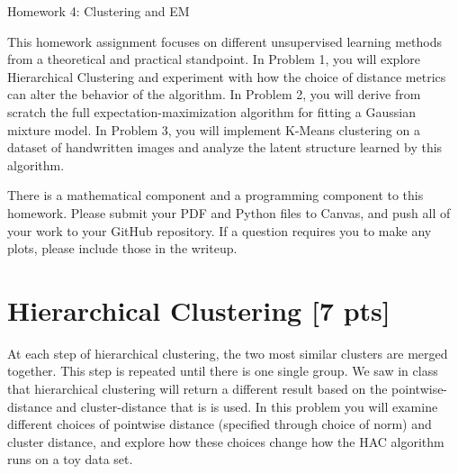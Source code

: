 \documentclass[submit]{harvardml}
\begin{document}
\begin{center}
{\Large Homework 4: Clustering and EM}\\
\end{center}


This homework assignment focuses on different unsupervised learning
methods from a theoretical and practical standpoint.  In Problem 1,
you will explore Hierarchical Clustering and experiment with how the
choice of distance metrics can alter the behavior of the algorithm. In
Problem 2, you will derive from scratch the full
expectation-maximization algorithm for fitting a Gaussian mixture
model. In Problem 3, you will implement K-Means clustering on a
dataset of handwritten images and analyze the latent structure learned
by this algorithm.

There is a mathematical component and a programming component to this
homework.  Please submit your PDF and Python files to Canvas, and push
all of your work to your GitHub repository. If a question requires you
to make any plots, please include those in the writeup.



\newpage
\section*{Hierarchical Clustering [7 pts]}

At each step of hierarchical clustering, the two most similar clusters
are merged together. This step is repeated until there is one single
group. We saw in class that hierarchical clustering will return a
different result based on the pointwise-distance and cluster-distance
that is is used. In this problem you will examine different choices of
pointwise distance (specified through choice of norm) and cluster
distance, and explore how these choices change how the HAC algorithm
runs on a toy data set.


\vspace{0.25cm}
\end{document}
